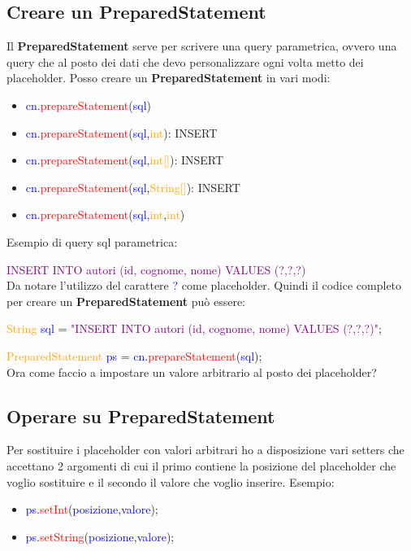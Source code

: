 \documentclass[11pt, letterpaper, titlepage]{article}
\begin{document}
\subsection{Creare un PreparedStatement}
Il \textbf{PreparedStatement} serve per scrivere una query parametrica, ovvero una query che
al posto dei dati che devo personalizzare ogni volta metto dei placeholder. Posso
creare un \textbf{PreparedStatement} in vari modi:
\begin{itemize}
    \item \textcolor{blue}{cn}.\textcolor{red}{prepareStatement}({\textcolor{blue}{sql}})
    \item \textcolor{blue}{cn}.\textcolor{red}{prepareStatement}({\textcolor{blue}{sql},\textcolor{orange}{int}}): INSERT
    \item \textcolor{blue}{cn}.\textcolor{red}{prepareStatement}({\textcolor{blue}{sql},\textcolor{orange}{int[]}}): INSERT
    \item \textcolor{blue}{cn}.\textcolor{red}{prepareStatement}({\textcolor{blue}{sql},\textcolor{orange}{String[]}}): INSERT
    \item \textcolor{blue}{cn}.\textcolor{red}{prepareStatement}({\textcolor{blue}{sql},\textcolor{orange}{int},\textcolor{orange}{int}})
\end{itemize}
Esempio di query sql parametrica:\par
\textcolor{purple}{INSERT INTO autori (id, cognome, nome) VALUES (?,?,?)}\\
Da notare l'utilizzo del carattere \textcolor{blue}{?} come placeholder. Quindi il
codice completo per creare un \textbf{PreparedStatement} può essere:\par
\textcolor{orange}{String} \textcolor{blue}{sql} = \textcolor{purple}{"INSERT INTO autori (id, cognome, nome) VALUES (?,?,?)"};\par
\textcolor{orange}{PreparedStatement} \textcolor{blue}{ps} = \textcolor{blue}{cn}.\textcolor{red}{prepareStatement}(\textcolor{blue}{sql});\\
Ora come faccio a impostare un valore arbitrario al posto dei placeholder?

\subsection{Operare su PreparedStatement}
Per sostituire i placeholder con valori arbitrari ho a disposizione vari setters che
accettano 2 argomenti di cui il primo contiene la posizione del placeholder che voglio
sostituire e il secondo il valore che voglio inserire. Esempio:
\begin{itemize}
    \item \textcolor{blue}{ps}.\textcolor{red}{setInt}(\textcolor{blue}{posizione},\textcolor{blue}{valore});
    \item \textcolor{blue}{ps}.\textcolor{red}{setString}(\textcolor{blue}{posizione},\textcolor{blue}{valore});
\end{itemize}
\end{document}
